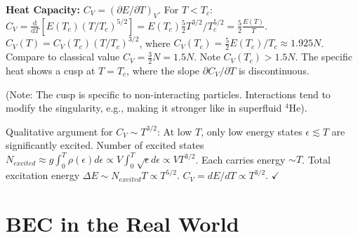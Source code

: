 \documentclass[11pt]{article}
\newcommand{\deriv}[2]{\frac{\mathrm{d} #1}{\mathrm{d} #2}}
\newcommand{\eps}{\epsilon}
\begin{document}
\textbf{Heat Capacity:} $C_V = (\partial E / \partial T)_V$.
For $T < T_c$: $C_V = \deriv{}{T} [E(T_c) (T/T_c)^{5/2}] = E(T_c) \frac{5}{2} T^{3/2} / T_c^{5/2} = \frac{5}{2} \frac{E(T)}{T}$.
$C_V(T) = C_V(T_c) (T/T_c)^{3/2}$, where $C_V(T_c) = \frac{5}{2} E(T_c)/T_c \approx 1.925 N$.
Compare to classical value $C_V = \frac{3}{2}N = 1.5 N$. Note $C_V(T_c) > 1.5 N$.
The specific heat shows a cusp at $T=T_c$, where the slope $\partial C_V / \partial T$ is discontinuous.

\begin{center}
\end{center}
(Note: The cusp is specific to non-interacting particles. Interactions tend to modify the singularity, e.g., making it stronger like in superfluid $^4$He).

Qualitative argument for $C_V \sim T^{3/2}$: At low $T$, only low energy states $\eps \lesssim T$ are significantly excited. Number of excited states $N_{excited} \approx g \int_0^T \rho(\eps) d\eps \propto V \int_0^T \sqrt{\eps} d\eps \propto V T^{3/2}$. Each carries energy $\sim T$. Total excitation energy $\Delta E \sim N_{excited} T \propto T^{5/2}$. $C_V = dE/dT \propto T^{3/2}$. $\checkmark$

\section*{BEC in the Real World}
\end{document}
